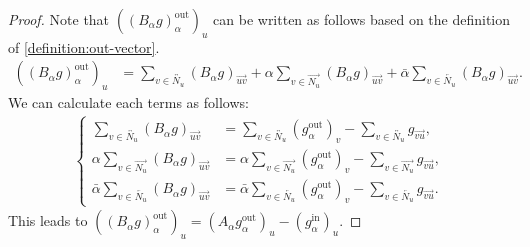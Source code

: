 \documentclass{article}
\theoremstyle{plain}
\begin{document}
\begin{proof}
	Note that $( \left( B_{\alpha} g \right)_{\alpha}^{\text{out}} )_{u}$ can be written as follows based on the definition of \eqref{definition:out-vector}.
	\begin{align*}
		\left( \left( B_{\alpha} g \right)_{\alpha}^{\text{out}} \right)_{u} & =
		\sum_{v \in \overleftrightarrow{N_u}} \left( B_{\alpha} g \right)_{\overrightarrow{uv}}
		+ \alpha \sum_{v \in \overrightarrow{N_u}} \left( B_{\alpha} g \right)_{\overrightarrow{uv}}
		+ \bar{\alpha} \sum_{v \in \overleftarrow{N_u}} \left( B_{\alpha} g \right)_{\overrightarrow{uv}}
		.
	\end{align*}
	We can calculate each terms as follows:
	\begin{align*} \left\{\begin{aligned}
			       \sum_{v \in \overleftrightarrow{N_u}} \left( B_{\alpha} g \right)_{\overrightarrow{uv}}
			        & =  \sum_{v \in \overleftrightarrow{N_u}} \left( g_{\alpha}^{\text{out}} \right)_{v}
			       - \sum_{v \in \overleftrightarrow{N_u}} g_{\overrightarrow{vu}}
			       ,                                                                                              \\
			       \alpha \sum_{v \in \overrightarrow{N_u}} \left( B_{\alpha} g \right)_{\overrightarrow{uv}}
			        & =  \alpha \sum_{v \in \overrightarrow{N_u}} \left( g_{\alpha}^{\text{out}} \right)_{v}
			       - \sum_{v \in \overrightarrow{N_u}} g_{\overrightarrow{vu}}
			       ,                                                                                              \\
			       \bar{\alpha} \sum_{v \in \overleftarrow{N_u}} \left( B_{\alpha} g \right)_{\overrightarrow{uv}}
			        & =  \bar{\alpha} \sum_{v \in \overleftarrow{N_u}} \left( g_{\alpha}^{\text{out}} \right)_{v}
			       - \sum_{v \in \overleftarrow{N_u}} g_{\overrightarrow{vu}}
			       .
		       \end{aligned}\right.
	\end{align*}
	This leads to $( \left( B_{\alpha} g \right)_{\alpha}^{\text{out}} )_{u} = ( A_{\alpha} g_{\alpha}^{\text{out}} )_{u} - ( g_{\alpha}^{\text{in}} )_{u}$.


\end{proof}
\end{document}
